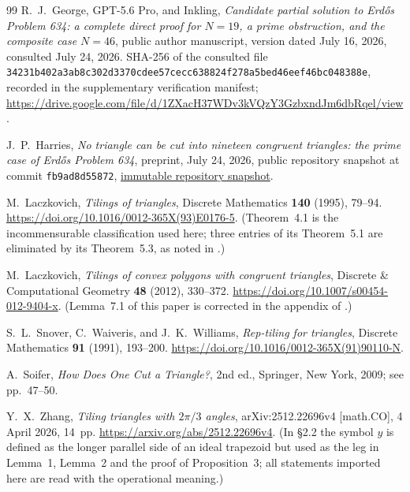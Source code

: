 \documentclass[11pt]{amsart}
\theoremstyle{definition}
\theoremstyle{remark}
\begin{document}
\begin{thebibliography}{99}
R.~J.~George, GPT-5.6 Pro, and Inkling,
\emph{Candidate partial solution to Erd\H{o}s Problem 634:
a complete direct proof for $N=19$, a prime obstruction, and the composite
case $N=46$},
public author manuscript, version dated July 16, 2026, consulted
July 24, 2026.  SHA-256 of the consulted file
\texttt{34231b402a3ab8c302d3370cdee57cecc638824f278a5bed46eef46bc048388e},
recorded in the supplementary verification manifest;
\url{https://drive.google.com/file/d/1ZXacH37WDv3kVQzY3GzbxndJm6dbRqel/view}.

J.~P.~Harries,
\emph{No triangle can be cut into nineteen congruent triangles:
the prime case of Erd\H{o}s Problem 634},
preprint, July 24, 2026, public repository snapshot at commit
\texttt{fb9ad8d55872},
\href{https://github.com/jphme/math-problems/tree/fb9ad8d55872260b4ffbf08cc389ee6db8a4ad40/no19tiling}{immutable
repository snapshot}.

M.~Laczkovich,
\emph{Tilings of triangles},
Discrete Mathematics \textbf{140} (1995), 79--94.
\url{https://doi.org/10.1016/0012-365X(93)E0176-5}.
(Theorem~4.1 is the incommensurable classification used here; three
entries of its Theorem~5.1 are eliminated by its Theorem~5.3, as noted in
\cite[\S7, footnote 4]{Beeson7}.)

M.~Laczkovich,
\emph{Tilings of convex polygons with congruent triangles},
Discrete \& Computational Geometry \textbf{48} (2012), 330--372.
\url{https://doi.org/10.1007/s00454-012-9404-x}.
(Lemma~7.1 of this paper is corrected in the appendix of \cite{BZRat}.)

S.~L.~Snover, C.~Waiveris, and J.~K.~Williams,
\emph{Rep-tiling for triangles},
Discrete Mathematics \textbf{91} (1991), 193--200.
\url{https://doi.org/10.1016/0012-365X(91)90110-N}.

A.~Soifer,
\emph{How Does One Cut a Triangle?},
2nd ed., Springer, New York, 2009; see pp.~47--50.

Y.~X.~Zhang,
\emph{Tiling triangles with $2\pi/3$ angles},
arXiv:2512.22696v4 [math.CO], 4 April 2026, 14~pp.
\url{https://arxiv.org/abs/2512.22696v4}.
(In \S2.2 the symbol $y$ is defined as the longer parallel side of an ideal
trapezoid but used as the leg in Lemma~1, Lemma~2 and the proof of
Proposition~3; all statements imported here are read with the operational
meaning.)

\end{thebibliography}
\end{document}
